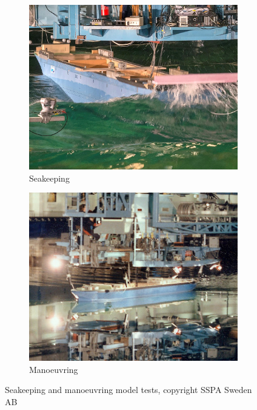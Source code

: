 \begin{figure}
    \centering
    \begin{subfigure}[b]{0.45\textwidth}
         \centering
         \includegraphics[width=\textwidth]{kappa/images/seakeeping.jpg}
         \caption{Seakeeping}
         \label{fig:seakeeping}
     \end{subfigure}
     \hfill
     \begin{subfigure}[b]{0.45\textwidth}
         \centering
         \includegraphics[width=\textwidth]{kappa/images/manoeuvring.jpg}
         \caption{Manoeuvring}
         \label{fig:manoeuvring}
     \end{subfigure}
     \hfill
    \caption{Seakeeping and manoeuvring model tests, copyright SSPA Sweden AB}
    \label{fig:seakeeping_and_manoeuvring}

\end{figure}

